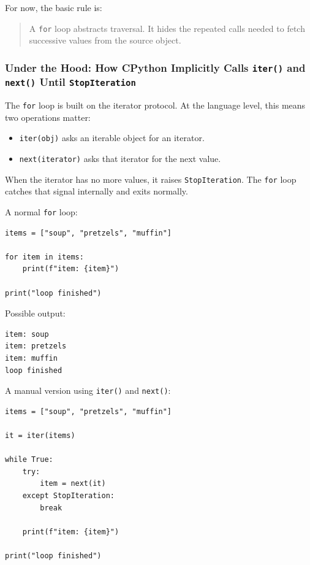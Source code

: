 For now, the basic rule is:

\begin{quote}
A \texttt{for} loop abstracts traversal. It hides the repeated calls needed to fetch successive values from the source object.
\end{quote}

\subsubsection{Under the Hood: How CPython Implicitly Calls \texttt{iter()} and \texttt{next()} Until \texttt{StopIteration}}

The \texttt{for} loop is built on the iterator protocol. At the language level, this means two operations matter:

\begin{itemize}
    \item \texttt{iter(obj)} asks an iterable object for an iterator.
    \item \texttt{next(iterator)} asks that iterator for the next value.
\end{itemize}

When the iterator has no more values, it raises \texttt{StopIteration}. The \texttt{for} loop catches that signal internally and exits normally.

A normal \texttt{for} loop:

\begin{verbatim}
items = ["soup", "pretzels", "muffin"]

for item in items:
    print(f"item: {item}")

print("loop finished")
\end{verbatim}

Possible output:

\begin{verbatim}
item: soup
item: pretzels
item: muffin
loop finished
\end{verbatim}

A manual version using \texttt{iter()} and \texttt{next()}:

\begin{verbatim}
items = ["soup", "pretzels", "muffin"]

it = iter(items)

while True:
    try:
        item = next(it)
    except StopIteration:
        break

    print(f"item: {item}")

print("loop finished")
\end{verbatim}

